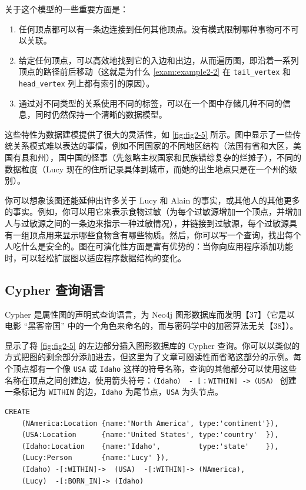 关于这个模型的一些重要方面是：

\begin{enumerate}
    \item 任何顶点都可以有一条边连接到任何其他顶点。没有模式限制哪种事物可不可以关联。
    \item 给定任何顶点，可以高效地找到它的入边和出边，从而遍历图，即沿着一系列顶点的路径前后移动（这就是为什么 \autoref{exam:example2-2} 在 \texttt{tail\_vertex} 和 \texttt{head\_vertex} 列上都有索引的原因）。
    \item 通过对不同类型的关系使用不同的标签，可以在一个图中存储几种不同的信息，同时仍然保持一个清晰的数据模型。    
\end{enumerate}

这些特性为数据建模提供了很大的灵活性，如 \autoref{fig:fig2-5} 所示。图中显示了一些传统关系模式难以表达的事情，例如不同国家的不同地区结构（法国有省和大区，美国有县和州），国中国的怪事（先忽略主权国家和民族错综复杂的烂摊子），不同的数据粒度（Lucy 现在的住所记录具体到城市，而她的出生地点只是在一个州的级别）。

你可以想象该图还能延伸出许多关于 Lucy 和 Alain 的事实，或其他人的其他更多的事实。例如，你可以用它来表示食物过敏（为每个过敏源增加一个顶点，并增加人与过敏源之间的一条边来指示一种过敏情况），并链接到过敏源，每个过敏源具有一组顶点用来显示哪些食物含有哪些物质。然后，你可以写一个查询，找出每个人吃什么是安全的。图在可演化性方面是富有优势的：当你向应用程序添加功能时，可以轻松扩展图以适应程序数据结构的变化。

\subsection{Cypher 查询语言}

Cypher 是属性图的声明式查询语言，为 Neo4j 图形数据库而发明【37】（它是以电影 “黑客帝国” 中的一个角色来命名的，而与密码学中的加密算法无关【38】）。

\author{exam:example2-3} 显示了将 \autoref{fig:fig2-5} 的左边部分插入图形数据库的 Cypher 查询。你可以以类似的方式把图的剩余部分添加进去，但这里为了文章可閱读性而省略这部分的示例。每个顶点都有一个像 \texttt{USA} 或 \texttt{Idaho} 这样的符号名称，查询的其他部分可以使用这些名称在顶点之间创建边，使用箭头符号：\texttt{（Idaho） - [：WITHIN] ->（USA）} 创建一条标记为 \texttt{WITHIN} 的边，\texttt{Idaho} 为尾节点，\texttt{USA} 为头节点。

\label{exam:example2-3}
\begin{lstlisting}[caption={将图 2-5 中的数据子集表示为 Cypher 查询}]
CREATE
    (NAmerica:Location {name:'North America', type:'continent'}),
    (USA:Location      {name:'United States', type:'country'  }),
    (Idaho:Location    {name:'Idaho',         type:'state'    }),
    (Lucy:Person       {name:'Lucy' }),
    (Idaho) -[:WITHIN]->  (USA)  -[:WITHIN]-> (NAmerica),
    (Lucy)  -[:BORN_IN]-> (Idaho)
\end{lstlisting}

